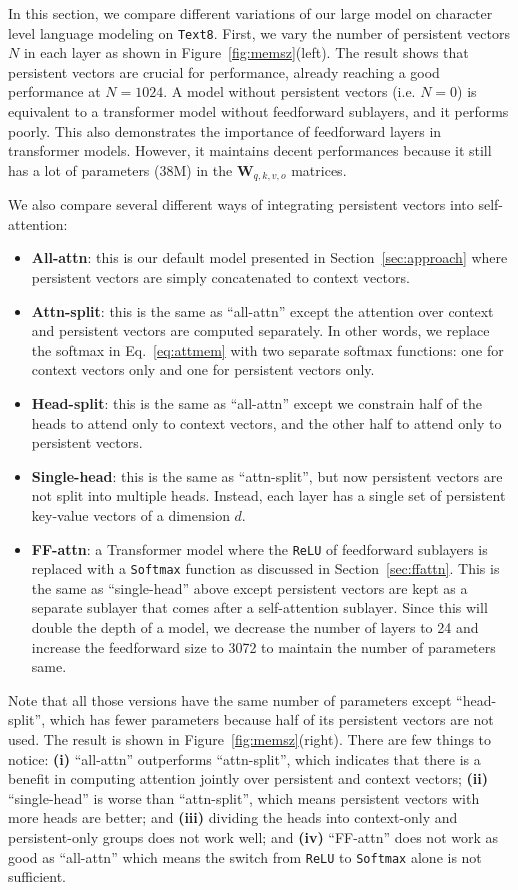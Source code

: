 \documentclass{article}
\newcommand{\secc}[1]{Section~\ref{sec:#1}}
\newcommand{\fig}[1]{Figure~\ref{fig:#1}}
\newcommand{\eq}[1]{Eq.~\ref{eq:#1}}
\begin{document}
In this section, we compare different variations of our large model on character level language modeling on \texttt{Text8}.
First, we vary the number of persistent vectors $N$ in each layer as shown in \fig{memsz}(left).
The result shows that persistent vectors are crucial for performance, already reaching a good performance at $N=1024$.
A model without persistent vectors (i.e. $N=0$) is equivalent to a transformer model without feedforward sublayers, and it performs poorly.
This also demonstrates the importance of feedforward layers in transformer models.
However, it maintains decent performances because it still has a lot of parameters ($38$M) in the $\mathbf{W}_{q,k,v,o}$ matrices.

We also compare several different ways of integrating persistent vectors into self-attention:
\begin{itemize}
  \item {\bf All-attn}: this is our default model presented in \secc{approach} where persistent vectors are simply concatenated to context vectors.
  \item {\bf Attn-split}: this is the same as ``all-attn'' except the attention over context and persistent vectors are computed separately. In other words, we replace the softmax in \eq{attmem} with two separate softmax functions: one for context vectors only and one for persistent vectors only.
  \item {\bf Head-split}: this is the same as ``all-attn'' except we constrain half of the heads to attend only to context vectors, and the other half to attend only to persistent vectors.
  \item {\bf Single-head}: this is the same as ``attn-split'', but now persistent vectors are not split into multiple heads. Instead, each layer has a single set of persistent key-value vectors of a dimension $d$.
  \item {\bf FF-attn}: a Transformer model where the \texttt{ReLU} of feedforward sublayers is replaced with a \texttt{Softmax} function as discussed in \secc{ffattn}. This is the same as ``single-head'' above except persistent vectors are kept as a separate sublayer that comes after a self-attention sublayer. Since this will double the depth of a model, we decrease the number of layers to 24 and increase the feedforward size to 3072 to maintain the number of parameters same.
\end{itemize}
Note that all those versions have the same number of parameters except ``head-split'', which has fewer parameters because half of its persistent vectors are not used.
The result is shown in \fig{memsz}(right).
There are few things to notice: {\bf (i)} ``all-attn'' outperforms ``attn-split'', which indicates that there is a benefit in computing attention jointly over persistent and context vectors; {\bf (ii)} ``single-head'' is worse than ``attn-split'', which means persistent vectors with more heads are better; and {\bf (iii)} dividing the heads into context-only and persistent-only groups does not work well; and {\bf (iv)} ``FF-attn'' does not work as good as ``all-attn'' which means the switch from \texttt{ReLU} to \texttt{Softmax} alone is not sufficient.
 
\end{document}

